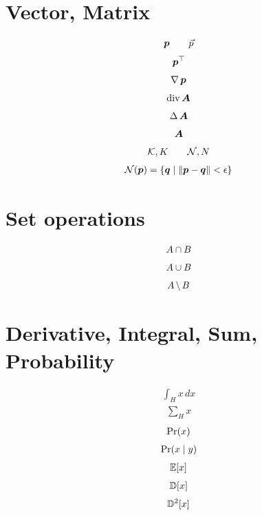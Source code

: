 \section{Vector, Matrix}
\begin{align}
    \vec{p} \qquad \vecarrow{p}
\end{align}
\begin{align}
    \bm{p}^{\top}
\end{align}
\begin{align}
    \operatorname{\nabla}{\bm{p}}
\end{align}
\begin{align}
    \operatorname{div}{\bm{A}}
\end{align}
\begin{align}
    \operatorname{\Delta}{\bm{A}}
\end{align}
\begin{align}
    \bm{A}
\end{align}
\begin{align}
    \mathcal{K} , K
    \qquad
    \mathcal{N} , N
\end{align}
\begin{align}
    \neighborhood{\vec{p}} = \left\{ \vec{q} \mid \norm{\vec{p} - \vec{q}} < \epsilon \right\}
\end{align}

\section{Set operations}
\begin{align}
    A \cap B
\end{align}
\begin{align}
    A \cup B
\end{align}
\begin{align}
    A \,\backslash\, B
\end{align}

\section{Derivative, Integral, Sum, Probability}
\begin{align}
    \int_H x \, dx
\end{align}
\begin{align}
    \sum_H x
\end{align}
\begin{align}
    \mathrm{Pr}(x)
\end{align}
\begin{align}
    \mathrm{Pr}(x\mid y)
\end{align}
\begin{align}
    \expectation{x}
\end{align}
\begin{align}
    \deviation{x}
\end{align}
\begin{align}
    \variance{x}
\end{align}



